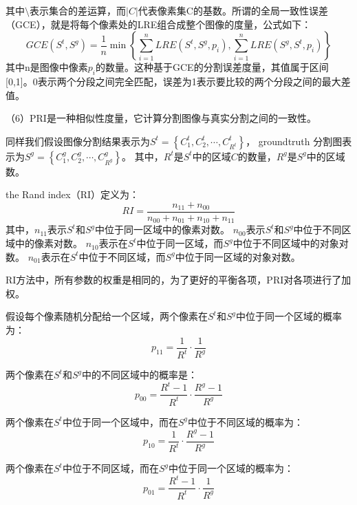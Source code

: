 其中$\setminus $表示集合的差运算，而$|C|$代表像素集C的基数。所谓的全局一致性误差（GCE），就是将每个像素处的LRE组合成整个图像的度量，公式如下：
\begin{equation}
GCE(S^{t},S^{g})=\frac{1}{n}\min \left \{ \sum_{i=1}^{n}LRE(S^{t},S^{g},p_i),\sum_{i=1}^{n}LRE(S^{g},S^{t},p_i)     \right \}
\end{equation}
其中n是图像中像素$p_i$的数量。这种基于GCE的分割误差度量，其值属于区间[0,1]。0表示两个分段之间完全匹配，误差为1表示要比较的两个分段之间的最大差值。

（6）PRI是一种相似性度量，它计算分割图像与真实分割之间的一致性。

同样我们假设图像分割结果表示为$S^{t} = \left \{ C_{1}^{t},C_{2}^{t},\cdots ,C_{R^{t}}^{t} \right \}$，
groundtruth 分割图表示为$S^{g} = \left \{ C_{1}^{g},C_{2}^{g},\cdots ,C_{R^{g}}^{g} \right \}$。
其中，$R^{t}$是$S^{t}$中的区域$C$的数量，$R^{g}$是$S^{g}$中的区域数。

the Rand index（RI）定义为：
\begin{equation}
RI = \frac{n_{11}+n_{00}}{n_{00}+n_{01}+n_{10}+n_{11}}
\end{equation}
其中，$n_{11}$表示$S^{t}$和$S^{g}$中位于同一区域中的像素对数。
$n_{00}$表示$S^{t}$和$S^{g}$中位于不同区域中的像素对数。
$n_{10}$表示在$S^{t}$中位于同一区域，而$S^{g}$中位于不同区域中的对象对数。
$n_{01}$表示在$S^{t}$中位于不同区域，而$S^{g}$中位于同一区域的对象对数。

RI方法中，所有参数的权重是相同的，为了更好的平衡各项，PRI对各项进行了加权。

假设每个像素随机分配给一个区域，两个像素在$S^{t}$和$S^{g}$中位于同一个区域的概率为：
\begin{equation}
p_{11}=\frac{1}{R^t} \cdot \frac{1}{R^g}
\end{equation}

两个像素在$S^{t}$和$S^{g}$中的不同区域中的概率是：
\begin{equation}
p_{00}=\frac{R^t-1}{R^t} \cdot \frac{R^g-1}{R^g}
\end{equation}

两个像素在$S^{t}$中位于同一个区域中，而在$S^{g}$中位于不同区域的概率为：
\begin{equation}
p_{10}=\frac{1}{R^t} \cdot \frac{R^g-1}{R^g}
\end{equation}

两个像素在$S^{t}$中位于不同区域，而在$S^{g}$中位于同一个区域的概率为：
\begin{equation}
p_{01}=\frac{R^t-1}{R^t} \cdot \frac{1}{R^g}
\end{equation}

